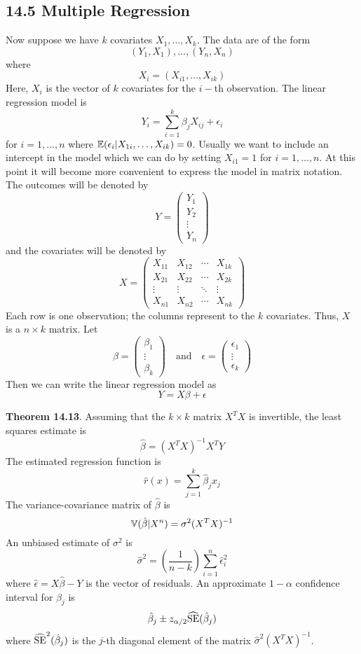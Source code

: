 \subsection*{14.5 Multiple Regression}\label{multiple-regression}
Now suppose we have \(k\) covariates \(X_{1}, \dots, X_{k}\). The data are
of the form
\[
(Y_{1}, X_{1}), \dots, (Y_{n}, X_{n})
\]
where
\[
X_{i} = (X_{i1}, \dots, X_{ik})
\]
Here, \(X_{i}\) is the vector of \(k\) covariates for the \(i-\)th
observation. The linear regression model is
\[
Y_{i} = \sum_{i=1}^{k} \beta_{j} X_{ij} + \epsilon_{i}
\]
for \(i = 1, \dots, n\) where
\(\operatorname{\mathbb{E}}(\epsilon_{i} | X_{1i}, \dots, X_{ik}) = 0\). Usually we want
to include an intercept in the model which we can do by setting
\(X_{i1} = 1\) for \(i = 1, \dots, n\). At this point it will become
more convenient to express the model in matrix notation. The outcomes
will be denoted by
\[
Y = \begin{pmatrix}
Y_{1} \\
Y_{2} \\
\vdots \\
Y_{n}
\end{pmatrix}
\]
and the covariates will be denoted by
\[
X = \begin{pmatrix}
X_{11} & X_{12} & \cdots & X_{1k} \\
X_{21} & X_{22} & \cdots & X_{2k} \\
\vdots & \vdots & \ddots & \vdots \\
X_{n1} & X_{n2} & \cdots & X_{nk}
\end{pmatrix}
\]
Each row is one observation; the columns represent to the \(k\)
covariates. Thus, \(X\) is a \(n \times k\) matrix. Let
\[
\beta = \begin{pmatrix}
\beta_{1} \\
\vdots \\
\beta_{k}
\end{pmatrix}
\quad \text{and} \quad
\epsilon = \begin{pmatrix}
\epsilon_{1} \\
\vdots \\
\epsilon_{k}
\end{pmatrix}
\]
Then we can write the linear regression model as
\[
Y = X \beta + \epsilon
\]

\textbf{Theorem 14.13}. Assuming that the \(k \times k\) matrix \(X^TX\)
is invertible, the least squares estimate is
\[
\hat{\beta} = (X^T X)^{-1} X^T Y
\]
The estimated regression function is
\[
\hat{r}(x) = \sum_{j=1}^{k} \hat{\beta}_{j} x_{j}
\]
The variance-covariance matrix of \(\hat{\beta}\) is
\[
\operatorname{\mathbb{V}}(\hat{\beta} | X^{n}) = \sigma^{2} (X^T X)^{-1}
\]
An unbiased estimate of \(\sigma^{2}\) is
\[
\hat{\sigma}^{2} = \left( \frac{1}{n - k} \right) \sum_{i=1}^{n} \hat{\epsilon}_{i}^{2}
\]
where \(\hat{\epsilon} = X \hat{\beta} - Y\) is the vector of residuals.
An approximate \(1 - \alpha\) confidence interval for \(\beta_{j}\) is
\[
\hat{\beta}_{j} \pm z_{\alpha/2} \widehat{\operatorname{\mathrm{SE}}}(\hat{\beta}_{j})
\]
where \(\widehat{\operatorname{\mathrm{SE}}}^{2}(\hat{\beta}_{j})\) is the \(j\)-th diagonal
element of the matrix \(\hat{\sigma}^{2} (X^T X)^{-1}\).

